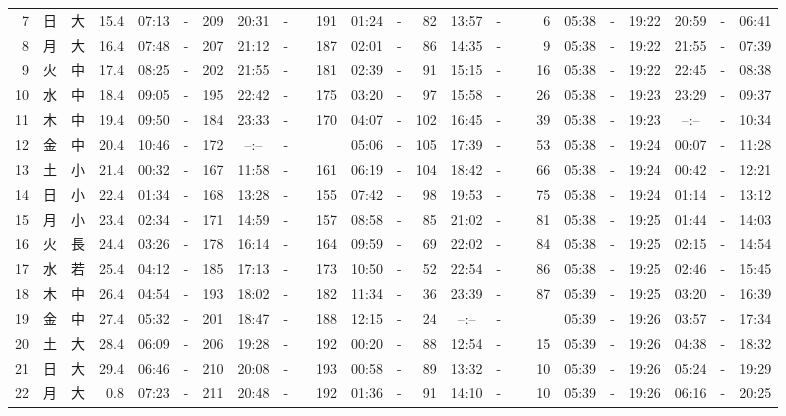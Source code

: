 \documentclass[12pt,a4j]{jsarticle}
\begin{document}
\begin{table}[htbp]
\begin{center}
{\begin{tabular}{|rc|cr|ccrccr|ccrccr|ccc|ccc|}
 7 & 日 & 大 & 15.4 &  07:13 &-& 209 &  20:31 &-& 191 &  01:24 &-&  82 &  13:57 &-&   6 & 05:38 & -& 19:22 & 20:59 & -& 06:41 \\
 8 & 月 & 大 & 16.4 &  07:48 &-& 207 &  21:12 &-& 187 &  02:01 &-&  86 &  14:35 &-&   9 & 05:38 & -& 19:22 & 21:55 & -& 07:39 \\
 9 & 火 & 中 & 17.4 &  08:25 &-& 202 &  21:55 &-& 181 &  02:39 &-&  91 &  15:15 &-&  16 & 05:38 & -& 19:22 & 22:45 & -& 08:38 \\
10 & 水 & 中 & 18.4 &  09:05 &-& 195 &  22:42 &-& 175 &  03:20 &-&  97 &  15:58 &-&  26 & 05:38 & -& 19:23 & 23:29 & -& 09:37 \\
11 & 木 & 中 & 19.4 &  09:50 &-& 184 &  23:33 &-& 170 &  04:07 &-& 102 &  16:45 &-&  39 & 05:38 & -& 19:23 & --:-- & -& 10:34 \\
12 & 金 & 中 & 20.4 &  10:46 &-& 172 &  --:-- &-&~~~~~ &  05:06 &-& 105 &  17:39 &-&  53 & 05:38 & -& 19:24 & 00:07 & -& 11:28 \\
13 & 土 & 小 & 21.4 &  00:32 &-& 167 &  11:58 &-& 161 &  06:19 &-& 104 &  18:42 &-&  66 & 05:38 & -& 19:24 & 00:42 & -& 12:21 \\
14 & 日 & 小 & 22.4 &  01:34 &-& 168 &  13:28 &-& 155 &  07:42 &-&  98 &  19:53 &-&  75 & 05:38 & -& 19:24 & 01:14 & -& 13:12 \\
15 & 月 & 小 & 23.4 &  02:34 &-& 171 &  14:59 &-& 157 &  08:58 &-&  85 &  21:02 &-&  81 & 05:38 & -& 19:25 & 01:44 & -& 14:03 \\
16 & 火 & 長 & 24.4 &  03:26 &-& 178 &  16:14 &-& 164 &  09:59 &-&  69 &  22:02 &-&  84 & 05:38 & -& 19:25 & 02:15 & -& 14:54 \\
17 & 水 & 若 & 25.4 &  04:12 &-& 185 &  17:13 &-& 173 &  10:50 &-&  52 &  22:54 &-&  86 & 05:38 & -& 19:25 & 02:46 & -& 15:45 \\
18 & 木 & 中 & 26.4 &  04:54 &-& 193 &  18:02 &-& 182 &  11:34 &-&  36 &  23:39 &-&  87 & 05:39 & -& 19:25 & 03:20 & -& 16:39 \\
19 & 金 & 中 & 27.4 &  05:32 &-& 201 &  18:47 &-& 188 &  12:15 &-&  24 &  --:-- &-&~~~~~ & 05:39 & -& 19:26 & 03:57 & -& 17:34 \\
20 & 土 & 大 & 28.4 &  06:09 &-& 206 &  19:28 &-& 192 &  00:20 &-&  88 &  12:54 &-&  15 & 05:39 & -& 19:26 & 04:38 & -& 18:32 \\
21 & 日 & 大 & 29.4 &  06:46 &-& 210 &  20:08 &-& 193 &  00:58 &-&  89 &  13:32 &-&  10 & 05:39 & -& 19:26 & 05:24 & -& 19:29 \\
22 & 月 & 大 &  0.8 &  07:23 &-& 211 &  20:48 &-& 192 &  01:36 &-&  91 &  14:10 &-&  10 & 05:39 & -& 19:26 & 06:16 & -& 20:25 \\

\end{tabular}}
\end{center}
\end{table}
\end{document}
